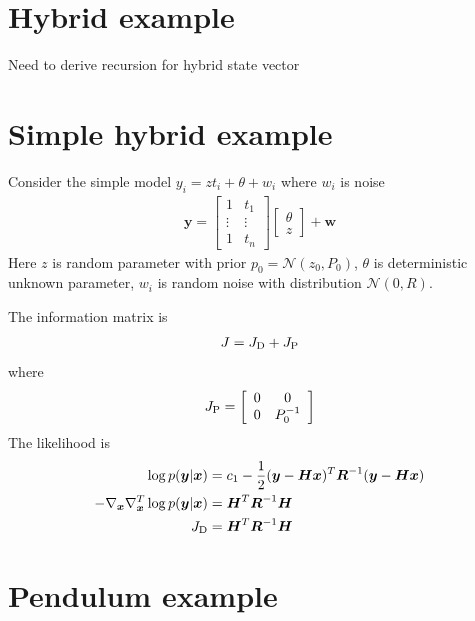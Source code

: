 \documentclass{article}
\renewcommand{\vec}[1]{\ensuremath{{\boldsymbol #1}}}
\newcommand{\mat}[1]{\ensuremath{\boldsymbol{#1}}}
\begin{document}
\section{Hybrid example}

\todo Need to derive recursion for hybrid state vector

\section{Simple hybrid example}

Consider the simple model $y_i = z t_i + \theta + w_i$ where $w_i$ is noise
\begin{align}
	\vec y = \left[\begin{array}{cc}
	 				 1 & t_1 \\ \vdots & \vdots \\ 1 & t_n 
					\end{array}\right] \left[\begin{array}{c}
					 				 \theta \\ z
									\end{array}\right] 	+ \vec w
\end{align}
Here $z$ is random parameter with prior $p_0 = \mathcal N(z_0,P_0)$, $\theta$ is deterministic unknown parameter, $w_i$ is random noise with distribution $\mathcal N(0,R)$.

The information matrix is
\begin{align}
	J = J_{\rm D} + J_{\rm P}
\end{align}
where
\begin{align}
	J_{\rm P} = \left[\begin{array}{cc}
	 				 0 & 0 \\ 0 & P_0^{-1} 
					\end{array}\right]
\end{align}
The likelihood is
\begin{align}
	\log p(\vec y|\vec x) &= c_1 -\frac{1}{2}(\vec y - \mat H\vec x)^T \mat R^{-1} (\vec y - \mat H\vec x) \\
-\nabla_{\vec x}\nabla_{\vec x}^T \log p(\vec y|\vec x) &= \mat H^T\mat R^{-1} \mat H \\
J_{\rm D} &= \mat H^T\mat R^{-1}\mat H
\end{align}


\section{Pendulum example}
\end{document}
